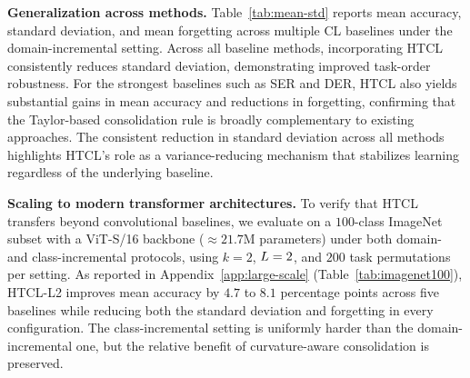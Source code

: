 \textbf{Generalization across methods.} Table~\ref{tab:mean-std} reports mean accuracy, standard deviation, and mean forgetting across multiple CL baselines under the domain-incremental setting. Across all baseline methods, incorporating HTCL consistently reduces standard deviation, demonstrating improved task-order robustness. For the strongest baselines such as SER and DER, HTCL also yields substantial gains in mean accuracy and reductions in forgetting, confirming that the Taylor-based consolidation rule is broadly complementary to existing approaches. The consistent reduction in standard deviation across all methods highlights HTCL's role as a variance-reducing mechanism that stabilizes learning regardless of the underlying baseline.  

\textbf{Scaling to modern transformer architectures.} To verify that HTCL transfers beyond convolutional baselines, we evaluate on a $100$-class ImageNet subset with a ViT-S/16 backbone ($\approx 21.7$M parameters) under both domain- and class-incremental protocols, using $k = 2$, $L = 2$, and $200$ task permutations per setting. As reported in Appendix~\ref{app:large-scale} (Table~\ref{tab:imagenet100}), HTCL-L2 improves mean accuracy by $4.7$ to $8.1$ percentage points across five baselines while reducing both the standard deviation and forgetting in every configuration. The class-incremental setting is uniformly harder than the domain-incremental one, but the relative benefit of curvature-aware consolidation is preserved.


